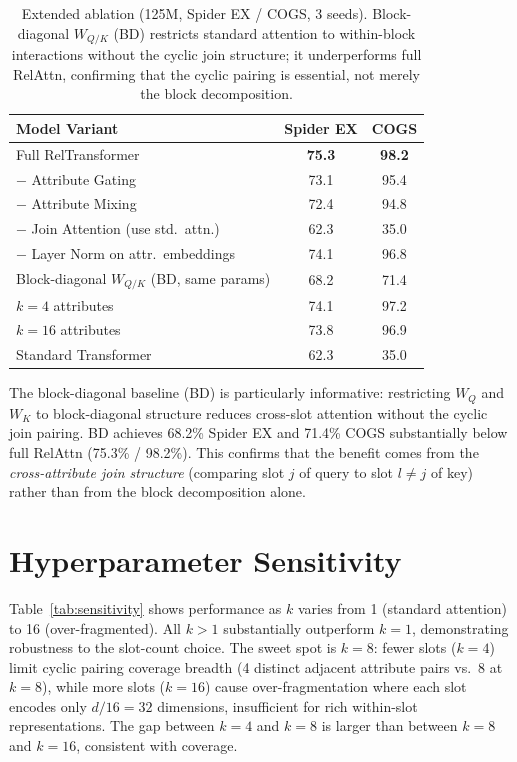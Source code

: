 \documentclass[conference]{IEEEtran}
\begin{document}
\begin{table}[tb]
\centering
\caption{Extended ablation (125M, Spider EX / COGS, 3 seeds). Block-diagonal $W_{Q/K}$ (BD) restricts standard attention to within-block interactions without the cyclic join structure; it underperforms full RelAttn, confirming that the cyclic pairing is essential, not merely the block decomposition.}
\label{tab:ablation_full}
\begin{tabular}{lcc}
\toprule
\textbf{Model Variant} & \textbf{Spider EX} & \textbf{COGS} \\
\midrule
Full RelTransformer & \textbf{75.3} & \textbf{98.2} \\
\quad$-$ Attribute Gating & 73.1 & 95.4 \\
\quad$-$ Attribute Mixing & 72.4 & 94.8 \\
\quad$-$ Join Attention (use std.\ attn.) & 62.3 & 35.0 \\
\quad$-$ Layer Norm on attr.\ embeddings & 74.1 & 96.8 \\
\quad Block-diagonal $W_{Q/K}$ (BD, same params) & 68.2 & 71.4 \\
\quad$k=4$ attributes & 74.1 & 97.2 \\
\quad$k=16$ attributes & 73.8 & 96.9 \\
\midrule
Standard Transformer & 62.3 & 35.0 \\
\bottomrule
\end{tabular}%
\end{table}

The block-diagonal baseline (BD) is particularly informative: restricting $W_Q$ and $W_K$ to block-diagonal structure reduces cross-slot attention without the cyclic join pairing. BD achieves 68.2\% Spider EX and 71.4\% COGS substantially below full RelAttn (75.3\% / 98.2\%). This confirms that the benefit comes from the \emph{cross-attribute join structure} (comparing slot $j$ of query to slot $l \neq j$ of key) rather than from the block decomposition alone.

\section{Hyperparameter Sensitivity}
\label{app:sensitivity}

Table~\ref{tab:sensitivity} shows performance as $k$ varies from 1 (standard attention) to 16 (over-fragmented). All $k > 1$ substantially outperform $k=1$, demonstrating robustness to the slot-count choice. The sweet spot is $k=8$: fewer slots ($k=4$) limit cyclic pairing coverage breadth (4 distinct adjacent attribute pairs vs.\ 8 at $k=8$), while more slots ($k=16$) cause over-fragmentation where each slot encodes only $d/16 = 32$ dimensions, insufficient for rich within-slot representations. The gap between $k=4$ and $k=8$ is larger than between $k=8$ and $k=16$, consistent with coverage.
\end{document}
